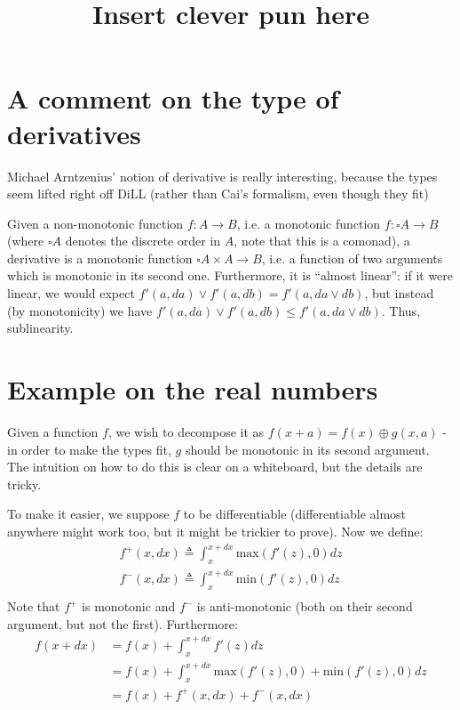 \documentclass[english]{article}
\theoremstyle{plain}
\theoremstyle{remark}
\theoremstyle{remark}
\theoremstyle{remark}
\theoremstyle{definition}
\theoremstyle{definition}
\newcommand{\ra}[0]{\rightarrow}
\begin{document}
\title{Insert clever pun here}
\author{}

\maketitle

\section{A comment on the type of derivatives}

Michael Arntzenius' notion of derivative is really interesting, because the types seem lifted right
off DiLL (rather than Cai's formalism, even though they fit)

Given a non-monotonic function $f : A \ra B$, i.e. a monotonic function $f : \square A \ra B$
(where $\square A$ denotes the discrete order in $A$, note that this is a comonad), a derivative
is a monotonic function $\square A \times A \ra B$, i.e. a function of two arguments which is
monotonic in its second one. Furthermore, it is ``almost linear'': if it were linear, we would
expect $f'(a, da) \vee f'(a, db) = f'(a, da \vee db)$, but instead (by monotonicity) we have
$f'(a, da) \vee f'(a, db) \leq f'(a, da \vee db)$. Thus, sublinearity.

\section{Example on the real numbers}

Given a function $f$, we wish to decompose it as $f(x + a) = f(x) \oplus g(x, a)$ - in order to
make the types fit, $g$ should be monotonic in its second argument. The intuition on how to
do this is clear on a whiteboard, but the details are tricky.

To make it easier, we suppose $f$ to be differentiable (differentiable almost anywhere might
work too, but it might be trickier to prove). Now we define:
\begin{align*}
  f^+(x, dx) \triangleq \int_x^{x + dx} \text{max}(f'(z), 0) dz\\
  f^-(x, dx) \triangleq \int_x^{x + dx} \text{min}(f'(z), 0) dz\\
\end{align*}
Note that $f^+$ is monotonic and $f^-$ is anti-monotonic (both on their second argument, but not
the first). Furthermore:
\begin{align*}
  f(x + dx) &= f(x) + \int_x^{x + dx} f'(z) dz \\
  &= f(x) + \int_x^{x + dx} \text{max}(f'(z), 0) + \text{min}(f'(z), 0) dz\\
  &= f(x) + f^+(x, dx) + f^-(x, dx)
\end{align*}
\end{document}
